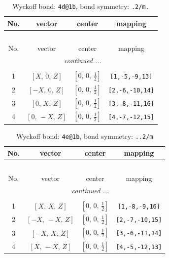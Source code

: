\documentclass[fleqn,8pt]{jsarticle}
\begin{document}
\begin{longtable}{cccc}
\caption{Wyckoff bond: {\tt 4d@1b}, bond symmetry: {\tt .2/m.}}
 \\
 \hline \hline
No. & vector & center & mapping \\ \hline \endfirsthead

\multicolumn{3}{l}{\tablename\ \thetable{}} \\
 \hline \hline
No. & vector & center & mapping \\ \hline \endhead

 \hline \hline
\multicolumn{3}{r}{\footnotesize\it continued ...} \\ \endfoot

 \hline \hline
\multicolumn{3}{r}{} \\ \endlastfoot

1 & $\left[ X,\, 0,\, Z \right]$ & $\left[ 0,\, 0,\, \frac{1}{2} \right]$ & {\tt [1,-5,-9,13]} \\ \hline
2 & $\left[ - X,\, 0,\, Z \right]$ & $\left[ 0,\, 0,\, \frac{1}{2} \right]$ & {\tt [2,-6,-10,14]} \\ \hline
3 & $\left[ 0,\, X,\, Z \right]$ & $\left[ 0,\, 0,\, \frac{1}{2} \right]$ & {\tt [3,-8,-11,16]} \\ \hline
4 & $\left[ 0,\, - X,\, Z \right]$ & $\left[ 0,\, 0,\, \frac{1}{2} \right]$ & {\tt [4,-7,-12,15]} \\
\end{longtable}
\renewcommand{\arraystretch}{1.2}
\begin{longtable}{cccc}
\caption{Wyckoff bond: {\tt 4e@1b}, bond symmetry: {\tt ..2/m}}
 \\
 \hline \hline
No. & vector & center & mapping \\ \hline \endfirsthead

\multicolumn{3}{l}{\tablename\ \thetable{}} \\
 \hline \hline
No. & vector & center & mapping \\ \hline \endhead

 \hline \hline
\multicolumn{3}{r}{\footnotesize\it continued ...} \\ \endfoot

 \hline \hline
\multicolumn{3}{r}{} \\ \endlastfoot

1 & $\left[ X,\, X,\, Z \right]$ & $\left[ 0,\, 0,\, \frac{1}{2} \right]$ & {\tt [1,-8,-9,16]} \\ \hline
2 & $\left[ - X,\, - X,\, Z \right]$ & $\left[ 0,\, 0,\, \frac{1}{2} \right]$ & {\tt [2,-7,-10,15]} \\ \hline
3 & $\left[ - X,\, X,\, Z \right]$ & $\left[ 0,\, 0,\, \frac{1}{2} \right]$ & {\tt [3,-6,-11,14]} \\ \hline
4 & $\left[ X,\, - X,\, Z \right]$ & $\left[ 0,\, 0,\, \frac{1}{2} \right]$ & {\tt [4,-5,-12,13]} \\
\end{longtable}
\end{document}
